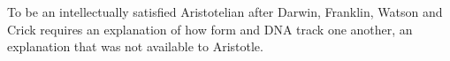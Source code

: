 To be an intellectually satisfied Aristotelian after Darwin, Franklin, Watson and Crick requires an explanation of how 
form and DNA track one another, an explanation that was not available to Aristotle.

%
%
%
%

